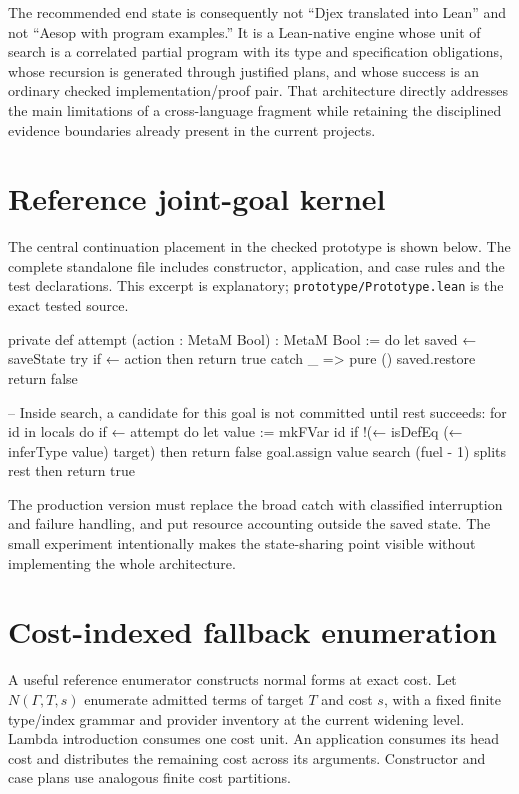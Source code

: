\documentclass[11pt,letterpaper]{article}
\newcommand{\pathref}[1]{\nolinkurl{#1}}
\newcommand{\Ctx}{\Gamma}
\theoremstyle{definition}
\theoremstyle{remark}
\begin{document}
The recommended end state is consequently not ``Djex translated into Lean'' and not ``Aesop with program examples.'' It is a Lean-native engine whose unit of search is a correlated partial program with its type and specification obligations, whose recursion is generated through justified plans, and whose success is an ordinary checked implementation/proof pair. That architecture directly addresses the main limitations of a cross-language fragment while retaining the disciplined evidence boundaries already present in the current projects.

\appendix
\section{Reference joint-goal kernel}
\label{app:core}

The central continuation placement in the checked prototype is shown below. The complete standalone file includes constructor, application, and case rules and the test declarations. This excerpt is explanatory; \pathref{prototype/Prototype.lean} is the exact tested source.
\begin{code}
private def attempt (action : MetaM Bool) : MetaM Bool := do
  let saved ← saveState
  try
    if ← action then return true
  catch _ => pure ()
  saved.restore
  return false

-- Inside search, a candidate for this goal is not committed until rest succeeds:
for id in locals do
  if ← attempt do
    let value := mkFVar id
    if !(← isDefEq (← inferType value) target) then return false
    goal.assign value
    search (fuel - 1) splits rest
  then return true
\end{code}

The production version must replace the broad catch with classified interruption and failure handling, and put resource accounting outside the saved state. The small experiment intentionally makes the state-sharing point visible without implementing the whole architecture.

\section{Cost-indexed fallback enumeration}
\label{app:enumeration}

A useful reference enumerator constructs normal forms at exact cost. Let $N(\Ctx,T,s)$ enumerate admitted terms of target $T$ and cost $s$, with a fixed finite type/index grammar and provider inventory at the current widening level. Lambda introduction consumes one cost unit. An application consumes its head cost and distributes the remaining cost across its arguments. Constructor and case plans use analogous finite cost partitions.
\end{document}
